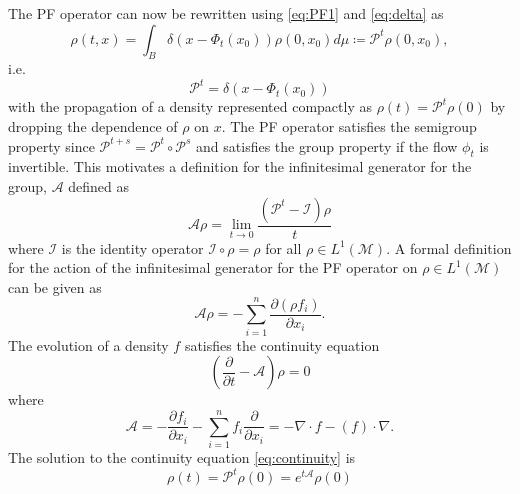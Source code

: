 \documentclass[pdflatex,sn-mathphys]{sn-jnl}%
\theoremstyle{thmstyleone}%
\theoremstyle{thmstyletwo}%
\theoremstyle{thmstylethree}%
\begin{document}
The PF operator can now be rewritten using \eqref{eq:PF1} and \eqref{eq:delta} as 
 \begin{equation}\label{eq:PF1new} 
      \rho(t,x)=   \int_B \delta(x-\Phi_t(x_0)) \rho(0,x_0) d\mu \coloneqq \mathcal{P}^t \rho(0,x_0),
\end{equation}
i.e.
 \begin{equation}\label{eq:PF2}
     \mathcal{P}^t =   \delta(x-\Phi_t(x_0))
\end{equation}
with the propagation of a density represented compactly as $\rho(t) = \mathcal{P}^t \rho(0)$ by dropping the dependence of $\rho$ on $x$. The PF operator satisfies the semigroup property since $\mathcal{P}^{t+s} = \mathcal{P}^t\circ \mathcal{P}^s$ and satisfies the group property if the flow $\phi_t$ is invertible. This motivates a definition for the infinitesimal generator for the group, $\mathcal{A}$ defined as 
\begin{equation} \label{eq:gen}
    \mathcal{A} \rho = \lim_{t \to 0}\frac{(\mathcal{P}^t - \mathcal{I})\rho}{t}
\end{equation}
where $\mathcal{I}$ is the identity operator $\mathcal{I}\circ \rho = \rho$ for all $\rho\in L^1(\mathcal{M})$.
A formal definition for the action of the infinitesimal generator for the PF operator on $\rho \in L^1(\mathcal{M})$ can be given as \cite{lasota_1994}
\begin{equation} \label{eq:gen1}
    \mathcal{A} \rho = -\sum_{i=1}^n \frac{\partial (\rho f_i)}{\partial x_i}.
\end{equation}
The evolution of a density $f$ satisfies the continuity equation
\begin{equation}\label{eq:continuity}
    \left(\frac{\partial }{\partial t} - \mathcal{A} \right) \rho = 0
\end{equation}
where 
\begin{equation}
    \mathcal{A}  = -\frac{\partial f_i}{\partial x_i} -\sum_{i=1}^n f_i\frac{\partial}{\partial x_i} = -\nabla \cdot f - (f) \cdot \nabla.
\end{equation}
The solution to the continuity equation \eqref{eq:continuity} is  
\begin{equation}\label{eq:PF_exp_def}
 \rho(t) =    \mathcal{P}^t \rho(0) = e^{t\mathcal{A}} \rho(0)
\end{equation}
\end{document}
